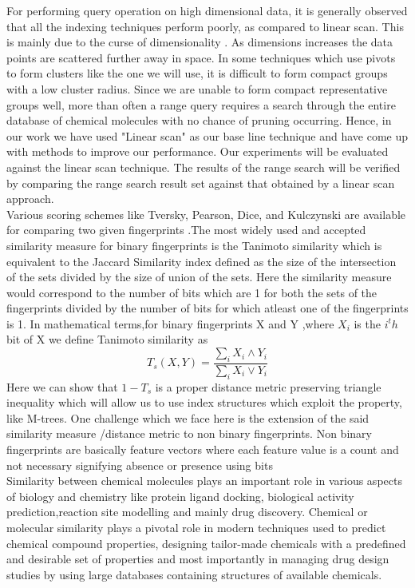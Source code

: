 	For performing query operation on high dimensional data, it is generally observed that all the indexing techniques perform poorly, as compared to linear scan. This is mainly due to the curse of dimensionality . As dimensions increases the data points are scattered further away in space. In some techniques which use pivots to form clusters like the one we will use, it is difficult to form compact groups with a low cluster radius. Since we are unable to form compact representative groups well, more than often a range query requires a search through the entire database of chemical molecules with no chance of pruning occurring.  Hence, in our work we have used "Linear scan" as our base line technique and have come up with  methods to improve our performance. Our experiments will be evaluated against the linear scan technique. The results of the range search will be verified by comparing the range search result set against that obtained by a linear scan approach.\\

	Various scoring schemes like Tversky, Pearson, Dice, and Kulczynski are available for comparing two given fingerprints \cite{willett2006similarity,swamidass2007bounds}.The most widely used and accepted similarity measure for binary fingerprints is the Tanimoto similarity which is equivalent to the Jaccard Similarity index defined as the size of the intersection of the sets divided by the size of union of the sets. Here the similarity measure would correspond to the number of bits which are 1 for both the sets of the fingerprints divided by the number of bits for which atleast one of the fingerprints is 1. In mathematical terms,for binary fingerprints X and Y ,where $X_i$ is the $i^th$ bit of X we define Tanimoto similarity as\[ T_s(X,Y) = \frac{\sum \limits_i X_i \wedge Y_i}
{\sum \limits_i X_i \vee Y_i} \] Here we can show that $1-T_s$ is a proper distance metric preserving triangle inequality which will allow us to use index structures which exploit the property, like M-trees. One challenge which we face here is the extension of the said similarity measure /distance metric to non binary fingerprints. Non binary fingerprints are basically feature vectors where each feature value is a count and not necessary signifying absence or presence using bits \\

	Similarity between chemical molecules plays an important role in various aspects of biology and chemistry like protein ligand docking, biological activity prediction,reaction site modelling and mainly drug discovery. Chemical or molecular similarity  plays a pivotal role in modern techniques used to predict chemical compound properties, designing tailor-made chemicals with a predefined and desirable set of properties and most importantly in managing drug design studies by using large databases containing structures of available chemicals.\\

